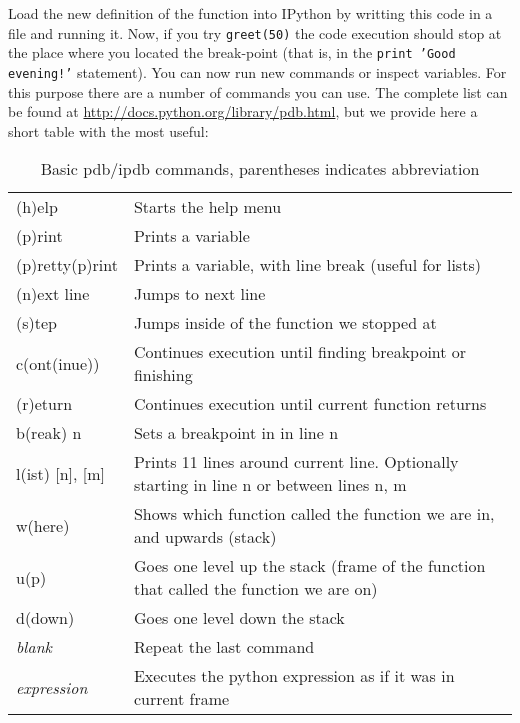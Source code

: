 Load the new definition of the function into IPython by writting this code in a file and running it. Now, if you try \texttt{greet(50)} the code execution should stop at the place where you located the break-point (that is, in the \texttt{print 'Good evening!'} statement). You can now run new commands or inspect variables. For this purpose there are a number of commands you can use. The complete list can be found at \url{http://docs.python.org/library/pdb.html}, but we provide here a short table with the most useful: 

\begin{table}[!h]
\begin{center}
\begin{tabular}{|l|l|}
\hline
(h)elp           & Starts the help menu\\
(p)rint          & Prints a variable\\
(p)retty(p)rint	 & Prints a variable, with line break (useful for lists)\\
\hline
(n)ext line      & Jumps to next line\\ 
(s)tep           & Jumps inside of the function we stopped at\\
c(ont(inue))     & Continues execution until finding breakpoint or finishing\\
(r)eturn         & Continues execution until current function returns\\
b(reak) n        & Sets a breakpoint in in line n\\
\hline
l(ist) [n], [m]  & Prints 11 lines around current line. Optionally starting in line n or between lines n, m\\
w(here)          & Shows which function called the function we are in, and upwards (stack\footnotemark)\\
u(p)             & Goes one level up the stack (frame of the function that called the function we are on)\\
d(down)          & Goes one level down the stack\\
\hline
\textit{blank}          & Repeat the last command\\ 
\textit{expression}     & Executes the python expression as if it was in current frame\\
\hline
\end{tabular}
\end{center}
\caption{\label{tb::pdbbasiccommands}Basic pdb/ipdb commands, parentheses indicates abbreviation}
\end{table}

